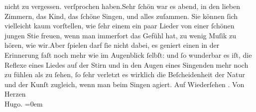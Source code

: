 \begin{ledgroupsized}[t]{13cm}
{{{                  nicht zu vergessen.}}}\label{T_L01319-1h} verſprochen haben.\hspace*{1.5em}Sehr ſchön war es \label{K_L01319-2v}\label{K_L01319-2h} abend, in den lieben Zimmern, das Kind, das ſchöne Singen, und alles zuſammen. Sie können
               ſich vielleicht kaum vorſtellen, wie ſehr einem ein paar Lieder von einer ſchönen
               jungen Sti{\geminationm}e freuen, wenn {\pb}man immerfort das Gefühl hat, zu
               wenig Muſik zu hören, wie wir.\hspace*{1.5em}Aber ſpielen darf ſie
               nicht dabei, es geniert einen in der Erinnerung faſt noch mehr wie im Augenblick
               ſelbſt: und ſo wunderbar es iſt, die Reflexe eines Liedes auf der Stirn und in den
               Augen eines Singenden mehr noch zu fühlen als zu ſehen, ſo ſehr {\pb}verletzt es wirklich die
               Beſcheidenheit der Natur und der Kunſt zugleich, wenn man beim Singen agiert.\pend
           \pstart
           Auf Wiederſehen \label{K_L01319-3v}\label{K_L01319-3h}.\pend
           \pstart
           Von Herzen{\\[\baselineskip]}\spacefill\mbox{Hugo.}\pend
           \leftskip=0em{}
         
         \endnumbering{}\end{ledgroupsized}  \newcommand{\dateiname}{L01319}\newcommand{\titel}{Hugo von Hofmannsthal an Arthur Schnitzler, 27. 9. [1903]}\newcommand{\editorInnen}{ Martin Anton Müller und Gerd-Hermann Susen}
      